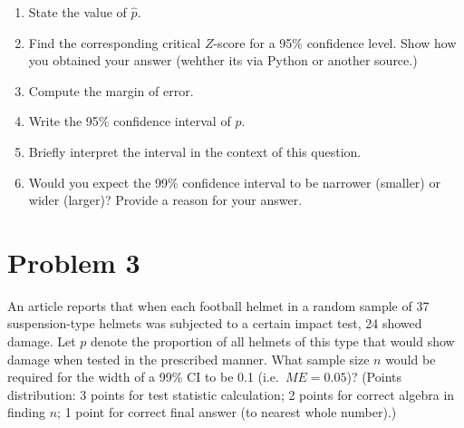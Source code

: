 \documentclass[11pt,twoside]{article}
\newcommand{\pts}[1]{\marginpar{ \small\hspace{0pt} \textit{[#1]} } }
\newcommand{\?}{\stackrel{?}{=}}
\begin{document}
  
  \begin{enumerate}[\bf (a)]
    \item State the value of $\hat p$. \pts{1}
    \vspace{2ex}
    
    \item Find the corresponding critical $Z$-score for a 95\% confidence level. Show how you obtained your answer (wehther its via Python or another source.)\pts{1}
    \vspace{14ex}

    \item Compute the margin of error. \pts{2}
    \vspace{16ex}

    \item Write the 95\% confidence interval of $p$. \pts{2}
    \vspace{14ex}

    \item Briefly interpret the interval in the context of this question. \pts{2}
    \vspace{14ex}

    \item Would you expect the 99\% confidence interval to be narrower (smaller) or wider (larger)? Provide a reason for your answer. \pts{2}
  \end{enumerate}
  

 
\eject


\section*{Problem 3 }
An article reports that when each football helmet in a random sample of 37 suspension-type helmets was subjected to a certain impact test, 24 showed damage. Let $p$ denote the proportion of all helmets of this type that would show damage when tested in the prescribed manner. What sample size $n$ would be required for the width of a 99\% CI to be 0.1 (i.e.\ $ME = 0.05$)? (Points distribution: 3 points for test statistic calculation; 2 points for correct algebra in finding $n$; 1 point for correct final answer (to nearest whole number).) \pts{6}


\eject
\end{document}
